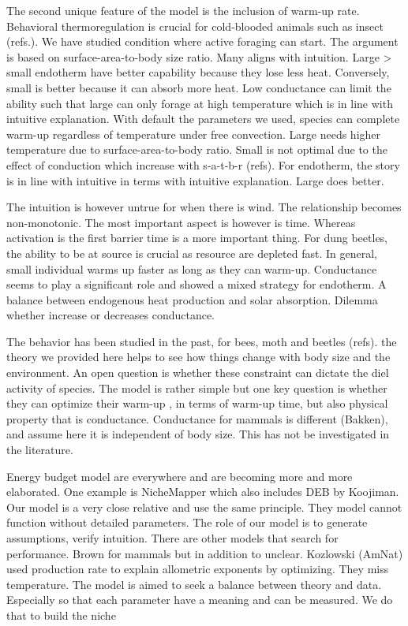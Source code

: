 The second unique feature of the model is the inclusion of warm-up rate.
Behavioral thermoregulation is crucial for cold-blooded animals such as insect (refs.).
We have studied condition where active foraging can start.
The argument is based on surface-area-to-body size ratio.
Many aligns with intuition. 
Large > small endotherm have better capability because they lose less heat.
Conversely, small is better because it can absorb more heat.
Low conductance can limit the ability such that large can only forage at high temperature which is in line with intuitive explanation.
With default the parameters we used, species can complete warm-up regardless of temperature under free convection.
Large needs higher temperature due to surface-area-to-body ratio. 
Small is not optimal due to the effect of conduction which increase with s-a-t-b-r (refs).
For endotherm, the story is in line with intuitive in terms with intuitive explanation.
Large does better. 

The intuition is however untrue for when there is wind. 
The relationship becomes non-monotonic. 
The most important aspect is however is time.
Whereas activation is the first barrier time is a more important thing.
For dung beetles, the ability to be at source is crucial as resource are depleted fast.
In general, small individual warms up faster as long as they can warm-up. 
Conductance seems to play a significant role and showed a mixed strategy for endotherm.
A balance between endogenous heat production and solar absorption. 
Dilemma whether increase or decreases conductance.

The behavior has been studied in the past, for bees, moth and beetles (refs).
the theory we provided here helps to see how things change with body size and the environment.
An open question is whether these constraint can dictate the diel activity of species.
The model is rather simple but one key question is whether they can optimize their warm-up , in terms of warm-up time, but also physical property that is conductance.
Conductance for mammals is different (Bakken), and assume here it is independent of body size.
This has not be investigated in the literature.

Energy budget model are everywhere and are becoming more and more elaborated.
One example is NicheMapper which also includes DEB by Koojiman.
Our model is a very close relative and use the same principle.
They model cannot function without detailed parameters.
The role of our model is to generate assumptions, verify intuition. 
There are other models that search for performance. 
Brown for mammals but in addition to unclear.
Kozlowski (AmNat) used production rate to explain allometric exponents by optimizing.
They miss temperature.  
The model is aimed to seek a balance between theory and data.
Especially so that each parameter have a meaning and can be measured.
We do that to build the niche 


